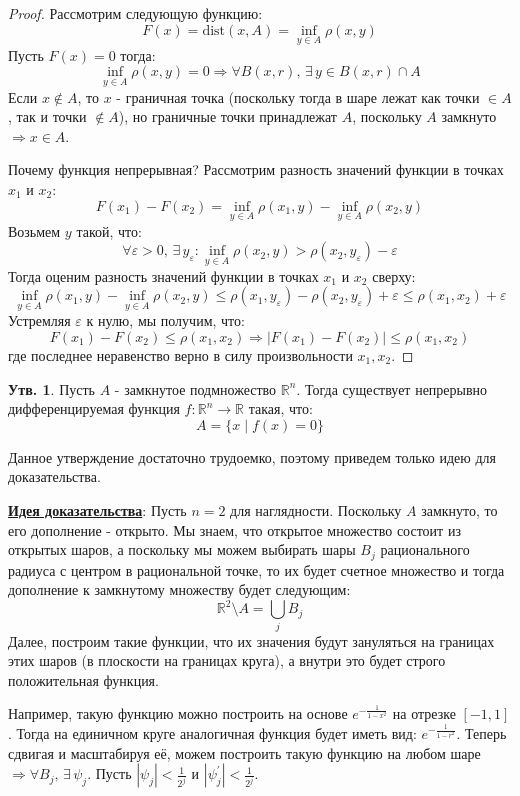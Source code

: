 \documentclass[12pt]{article}
\newcommand{\MR}{\mathbb{R}}
\newcommand{\VE}{\varepsilon}
\theoremstyle{definition}
\newtheorem{prop}{Утв.}
\begin{document}
\begin{proof}
	Рассмотрим следующую функцию:
	$$
		F(x) = \text{dist}(x,A) = \inf\limits_{y \in A}\rho(x,y)
	$$
	Пусть $F(x) = 0$ тогда: 
	$$
		\inf\limits_{y \in A}\rho(x,y) = 0 \Rightarrow \forall B(x,r), \, \exists \, y \in B(x,r) \cap A
	$$ 
	Если $x \notin A$, то $x$ - граничная точка (поскольку тогда в шаре лежат как точки $\in A$, так и точки $\notin A$), но граничные точки принадлежат $A$, поскольку $A$ замкнуто $\Rightarrow x \in A$. 
	
	Почему функция непрерывная? Рассмотрим разность значений функции в точках $x_1$ и $x_2$:
	$$
		F(x_1) - F(x_2) = \inf\limits_{y \in A}\rho(x_1,y) - \inf\limits_{y \in A}\rho(x_2,y)
	$$
	Возьмем $y$ такой, что:
	$$
		\forall \VE > 0,\, \exists \, y_\VE \colon \inf\limits_{y \in A}\rho(x_2,y) > \rho(x_2,y_\VE) - \VE
	$$
	Тогда оценим разность значений функции в точках $x_1$ и $x_2$ сверху:
	$$
		\inf\limits_{y \in A}\rho(x_1,y) - \inf\limits_{y \in A}\rho(x_2,y) \leq \rho(x_1, y_\VE) - \rho(x_2, y_\VE) + \VE \leq \rho(x_1, x_2) + \VE
	$$
	Устремляя $\VE$ к нулю, мы получим, что: 
	$$
		F(x_1) - F(x_2) \leq \rho(x_1,x_2) \Rightarrow |F(x_1) - F(x_2)| \leq \rho(x_1,x_2)
	$$
	где последнее неравенство верно в силу произвольности $x_1, x_2$.
\end{proof}
\begin{prop}
	Пусть $A$ - замкнутое подмножество $\MR^n$. Тогда существует непрерывно дифференцируемая функция $f \colon \MR^n \to \MR$ такая, что:
	$$
		A = \{ x \mid f(x) = 0  \}
	$$
\end{prop}
Данное утверждение достаточно трудоемко, поэтому приведем только идею для доказательства.

\textbf{\uline{Идея доказательства}}: Пусть $n = 2$ для наглядности. Поскольку $A$ замкнуто, то его дополнение - открыто. Мы знаем, что открытое множество состоит из открытых шаров, а поскольку мы можем выбирать шары $B_j$ рационального радиуса с центром в рациональной точке, то их будет счетное множество и тогда дополнение к замкнутому множеству будет следующим:
$$
	\MR^2 \setminus A = \bigcup\limits_j B_j
$$
Далее, построим такие функции, что их значения будут зануляться на границах этих шаров (в плоскости на границах круга), а внутри это будет строго положительная функция. 

Например, такую функцию можно построить на основе $e^{-\tfrac{1}{1 - x^2}}$ на отрезке $[-1,1]$. Тогда на единичном круге аналогичная функция будет иметь вид: $e^{-\tfrac{1}{1 - r^2}}$. Теперь сдвигая и масштабируя её, можем построить такую функцию на любом шаре $\Rightarrow \forall B_j, \, \exists \, \psi_j$. Пусть $|\psi_j| < \tfrac{1}{2^j}$ и $|\psi_j^\prime| < \tfrac{1}{2^j}$.
\end{document}

